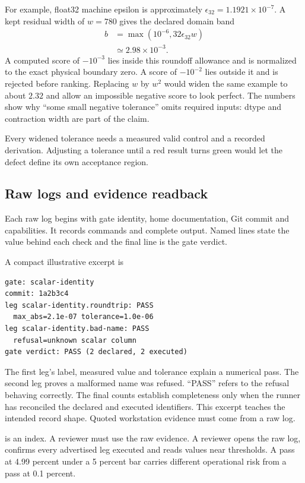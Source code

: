 For example, float32 machine epsilon is approximately
\(\epsilon_{32}=1.1921\times10^{-7}\).  A kept residual width of $w=780$
gives the declared domain band
\begin{align*}
 b&=\max(10^{-6},32\epsilon_{32}w)\\
  &\simeq 2.98\times10^{-3}.
\end{align*}
A computed score of $-10^{-3}$ lies inside this roundoff allowance and is
normalized to the exact physical boundary zero.  A score of $-10^{-2}$
lies outside it and is rejected before ranking.  Replacing $w$ by $w^2$
would widen the same example to about $2.32$ and allow an impossible negative
score to look perfect.  The numbers show why ``some small negative
tolerance'' omits required inputs: dtype and contraction width are part of the
claim.

Every widened tolerance needs a measured valid control and a recorded
derivation.  Adjusting a tolerance until a red result turns green would let the
defect define its own acceptance region.

\subsection{Raw logs and evidence readback}

Each raw log begins with gate identity, home documentation, Git commit and
capabilities.  It records commands and complete output.  Named lines state the
value behind each check and the final line is the gate verdict.

A compact illustrative excerpt is
\begin{verbatim}
gate: scalar-identity
commit: 1a2b3c4
leg scalar-identity.roundtrip: PASS
  max_abs=2.1e-07 tolerance=1.0e-06
leg scalar-identity.bad-name: PASS
  refusal=unknown scalar column
gate verdict: PASS (2 declared, 2 executed)
\end{verbatim}
The first leg's label, measured value and tolerance explain a numerical pass.
The second leg proves a malformed name was refused. ``PASS'' refers to the
refusal behaving correctly.  The final counts establish completeness only
when the runner has reconciled the declared and executed identifiers.  This
excerpt teaches the intended record shape.  Quoted workstation evidence must
come from a raw log.

 is an index.  A reviewer must use the raw evidence.  A reviewer
opens the raw log, confirms every advertised leg executed and reads values
near thresholds.  A pass at 4.99 percent under a 5 percent bar carries
different operational risk from a pass at 0.1 percent.

